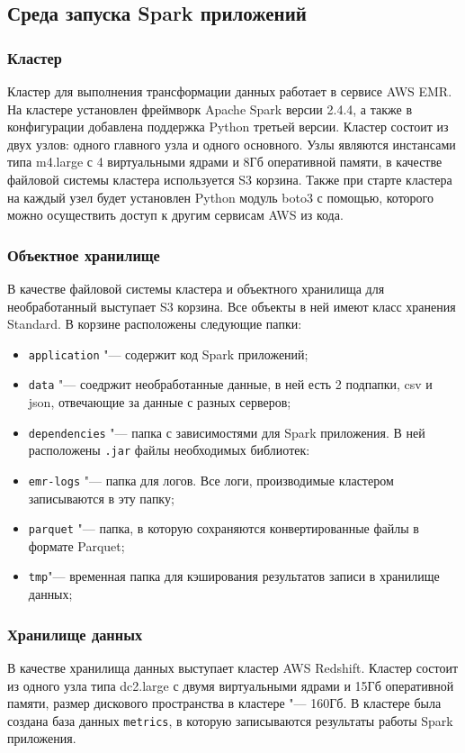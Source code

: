 \documentclass[bachelor, och, pract]{SCWorks}
\begin{document}
\subsection{Среда запуска Spark приложений}
\subsubsection{Кластер}
Кластер для выполнения трансформации данных работает в сервисе AWS EMR. На кластере установлен фреймворк Apache Spark версии 2.4.4, а также в конфигурации добавлена поддержка Python третьей версии. Кластер состоит из двух узлов: одного главного узла и одного основного. Узлы являются инстансами типа m4.large с 4 виртуальными ядрами и 8Гб оперативной памяти, в качестве файловой системы кластера используется S3 корзина. Также при старте кластера на каждый узел будет установлен Python модуль boto3 с помощью, которого можно осуществить доступ к другим сервисам AWS из кода.

\subsubsection{Объектное хранилище}
В качестве файловой системы кластера и объектного хранилища для необработанный выступает S3 корзина. Все объекты в ней имеют класс хранения Standard. 
В корзине расположены следующие папки:
\begin{itemize}
	\item \verb|application| "--- содержит код Spark приложений;
	\item \verb|data| "--- соедржит необработанные данные, в ней есть 2 подпапки, csv и json, отвечающие за данные с разных серверов;
	\item \verb|dependencies| "--- папка с зависимостями для Spark приложения. В ней расположены \verb|.jar| файлы необходимых библиотек:
	\item \verb|emr-logs| "--- папка для логов. Все логи, производимые кластером записываются в эту папку;
	\item \verb|parquet| "--- папка, в которую сохраняются конвертированные файлы в формате  Parquet;
	\item \verb|tmp|"--- временная  папка для кэширования результатов записи в хранилище данных;
\end{itemize}

\subsubsection{Хранилище данных}
В качестве хранилища данных выступает кластер AWS Redshift. Кластер состоит из одного узла типа dc2.large с двумя виртуальными ядрами и 15Гб оперативной памяти, размер дискового пространства в кластере "--- 160Гб. В кластере была создана база данных \verb|metrics|, в которую записываются результаты работы Spark приложения. 
\end{document}
